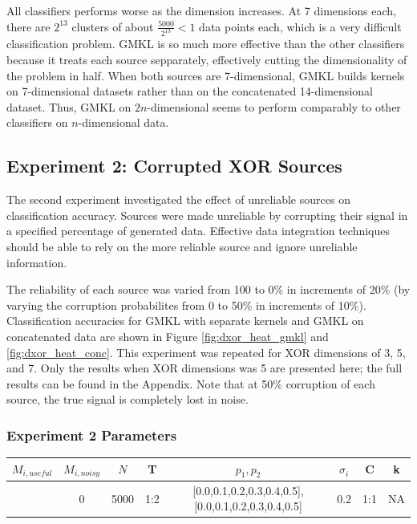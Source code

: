 \documentclass{article}
\begin{document}
All classifiers performs worse as the dimension increases. At 7 dimensions
each, there are $2^{13}$ clusters of about $\frac{5000}{2^{13}} < 1$ data
points each, which is a very difficult classification problem. GMKL is so much
more effective than the other classifiers because it treats each source
sepparately, effectively cutting the dimensionality of the problem in half.
When both sources are 7-dimensional, GMKL builds kernels on 7-dimensional
datasets rather than on the concatenated 14-dimensional dataset. Thus, GMKL on
$2n$-dimensional seems to perform comparably to other classifiers on
$n$-dimensional data.








\subsection*{Experiment 2: Corrupted XOR Sources}

The second experiment investigated the effect of unreliable sources on
classification accuracy. Sources were made unreliable by corrupting their
signal in a specified percentage of generated data. Effective data integration
techniques should be able to rely on the more reliable source and ignore
unreliable information.

The reliability of each source was varied from 100 to 0\% in increments of 20\%
(by varying the corruption probabilites from 0 to 50\% in increments of 10\%).
Classification accuracies for GMKL with separate kernels and GMKL on
concatenated data are shown in Figure \ref{fig:dxor_heat_gmkl} and
\ref{fig:dxor_heat_conc}. This experiment was repeated for XOR dimensions of 3,
5, and 7. Only the results when XOR dimensions was 5 are presented here; the
full results can be found in the Appendix. Note that at 50\% corruption of each
source, the true signal is completely lost in noise.

\begin{minipage}{\textwidth}
\centering
\subsubsection*{Experiment 2 Parameters}
\begin{tabular}{|c|c|c|c|c|c|c|c|}
\hline
$M_{i,useful}$ & $M_{i, noisy}$ & $N$ & T &  $p_1, p_2$ & $\sigma_i$ & C &  k  \\
\hline
[3,5,7] & 0 & 5000 & 1:2 & [0.0,0.1,0.2,0.3,0.4,0.5],[0.0,0.1,0.2,0.3,0.4,0.5] & 0.2 & 1:1 & NA  \\
\hline
\end{tabular}
\label{tab:exp_2_params}
\end{minipage}
\end{document}
